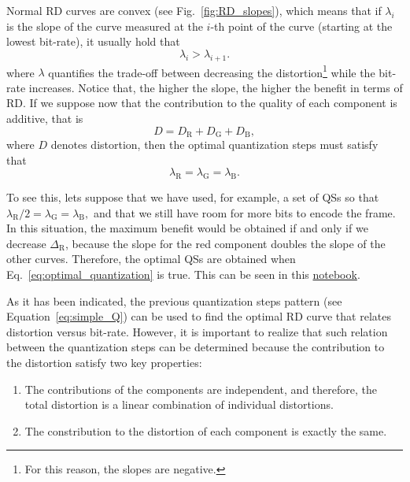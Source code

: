 Normal RD curves are convex (see Fig.~\ref{fig:RD_slopes}), which
means that if $\lambda_i$ is the slope of the curve measured at the
$i$-th point of the curve (starting at the lowest bit-rate), it
usually hold that
\begin{equation}
  \lambda_i > \lambda_{i+1}.
\end{equation}
where $\lambda$ quantifies the trade-off between decreasing the
distortion\footnote{For this reason, the slopes are negative.} while
the bit-rate increases. Notice that, the higher the slope, the higher
the benefit in terms of RD. If we suppose now that the contribution to
the quality of each component is additive, that is
\begin{equation}
  D = D_{\text{R}} + D_{\text{G}} + D_{\text{B}},
\end{equation}
where $D$ denotes distortion, then the optimal quantization steps must
satisfy that~\cite{vetterli1995wavelets,sayood2017introduction}
\begin{equation}
  \lambda_{\text{R}} = \lambda_{\text{G}} = \lambda_{\text{B}}.
  \label{eq:optimal_quantization}
\end{equation}

To see this, lets suppose that we have used, for example, a set of QSs
so that $\lambda_{\text{R}}/2 = \lambda_{\text{G}} =
\lambda_{\text{B}},$ and that we still have room for more bits to
encode the frame. In this situation, the maximum benefit would be
obtained if and only if we decrease $\Delta_{\text{R}}$, because the
slope for the red component doubles the slope of the other
curves. Therefore, the optimal QSs are obtained when
Eq.~\ref{eq:optimal_quantization} is true. This can be seen in this
\href{https://github.com/Sistemas-Multimedia/Sistemas-Multimedia.github.io/blob/master/milestones/05-RGB_compression/RGB_compression.ipynb}{notebook}.

As it has been indicated, the previous quantization steps pattern (see
Equation~\ref{eq:simple_Q}) can be used to find the optimal RD curve
that relates distortion versus bit-rate. However, it is important to
realize that such relation between the quantization steps can be
determined because the contribution to the distortion satisfy two key
properties:
\begin{enumerate}
\item The contributions of the components are independent, and
  therefore, the total distortion is a linear combination of
  individual distortions.
\item The constribution to the distortion of each component is exactly
  the same.
\end{enumerate}

